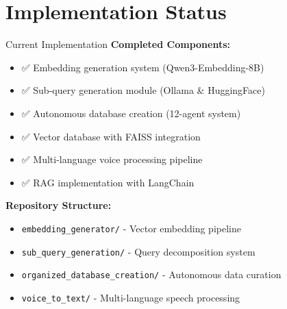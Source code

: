 \documentclass[aspectratio=169]{beamer}
\begin{document}
\section{Implementation Status}

\begin{frame}{Current Implementation}
\textbf{Completed Components:}
\begin{itemize}
\item ✅ Embedding generation system (Qwen3-Embedding-8B)
\item ✅ Sub-query generation module (Ollama \& HuggingFace)
\item ✅ Autonomous database creation (12-agent system)
\item ✅ Vector database with FAISS integration
\item ✅ Multi-language voice processing pipeline
\item ✅ RAG implementation with LangChain
\end{itemize}

\textbf{Repository Structure:}
\begin{itemize}
\item \texttt{embedding\_generator/} - Vector embedding pipeline
\item \texttt{sub\_query\_generation/} - Query decomposition system
\item \texttt{organized\_database\_creation/} - Autonomous data curation
\item \texttt{voice\_to\_text/} - Multi-language speech processing
\end{itemize}
\end{frame}
\end{document}
